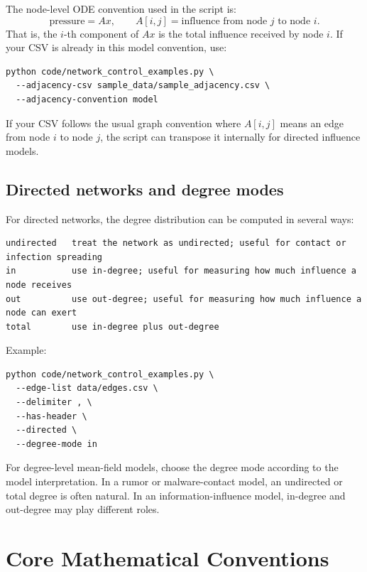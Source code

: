 \documentclass[11pt,a4paper]{article}
\begin{document}
The node-level ODE convention used in the script is:
\[
  \text{pressure}=A x,
  \qquad
  A[i,j]=\text{influence from node }j\text{ to node }i.
\]
That is, the \(i\)-th component of \(Ax\) is the total influence received by node \(i\). If your CSV is already in this model convention, use:

\begin{lstlisting}[style=bash]
python code/network_control_examples.py \
  --adjacency-csv sample_data/sample_adjacency.csv \
  --adjacency-convention model
\end{lstlisting}

If your CSV follows the usual graph convention where \(A[i,j]\) means an edge from node \(i\) to node \(j\), the script can transpose it internally for directed influence models.

\subsection{Directed networks and degree modes}

For directed networks, the degree distribution can be computed in several ways:

\begin{lstlisting}[style=text]
undirected   treat the network as undirected; useful for contact or infection spreading
in           use in-degree; useful for measuring how much influence a node receives
out          use out-degree; useful for measuring how much influence a node can exert
total        use in-degree plus out-degree
\end{lstlisting}

Example:

\begin{lstlisting}[style=bash]
python code/network_control_examples.py \
  --edge-list data/edges.csv \
  --delimiter , \
  --has-header \
  --directed \
  --degree-mode in
\end{lstlisting}

For degree-level mean-field models, choose the degree mode according to the model interpretation. In a rumor or malware-contact model, an undirected or total degree is often natural. In an information-influence model, in-degree and out-degree may play different roles.

\section{Core Mathematical Conventions}
\end{document}

